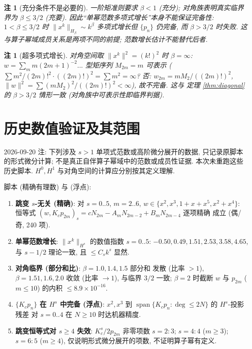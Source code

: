 \documentclass[UTF8]{ctexart}
\newtheorem{remark}[theorem]{注}
\begin{document}
\begin{remark}[充分条件不是必要的]
	一阶矩准则要求 $\beta < 1$ (充分); 对角族表明真实临界界为
	$\beta \leq 3/2$ (充要). 因此``单幂范数多项式增长''本身不能保证完备性:
	$1 < \beta \leq 3/2$ 时 $\|x^k\|_{H_\beta} \sim k^\beta$ 多项式增长但
	$\{p_n\}$ 仍完备, 而 $\beta > 3/2$ 时失败.
	这与算子幂域成员关系是两项不同的前提; 范数增长估计不能替代后者.
\end{remark}

\begin{remark}[超多项式增长]
	对角空间取 $\|x^k\|^2 = (k!)^2$ 时 $\beta = \infty$: $w = \sum_m
	m(2m+1)^{-2}...$ 型矩序列 $M_{2m} = m$ 可表示 ($\sum m^2/(2m)!^2
	\cdot ((2m)!)^2 = \sum m^2 = \infty$? 否: $w_{2m} = mM_2/((2m)!)^2$,
	$\|w\|^2 = \sum (mM_2)^2/((2m)!)^2 < \infty$), 故不完备. 这与
	定理 \ref{thm:diagonal} 的 $\beta > 3/2$ 情形一致 (对角族中可表示性即临界判据).
\end{remark}

\section{历史数值验证及其范围}
2026-09-20 注: 下列涉及 $s>1$ 单项式范数或高阶微分展开的数据,
只记录原脚本的形式微分计算; 不是真正自伴算子幂域中的范数或成员性证据.
本次未重跑这些历史脚本. $H^0,H^1$ 与对角空间的计算应分别按其定义理解.


脚本  (精确有理数) 与
 (浮点):
\begin{enumerate}
	\item \textbf{跳变 $s$-无关 (精确)}: 对 $s = 0..5$, $m = 2..6$,
		$w \in \{x^2, x^3, 1+x+x^5, x^2+x^4\}$: 恒等式
		$(w, K_c p_{2m})_s = cN_{2m} - A_mN_{2m-2} + B_mN_{2m-4}$ 逐项精确
		成立 (偶/奇, 240 项).
	\item \textbf{单幂范数增长}: $\|x^k\|_{H^s}$ 的数值指数 $s = 0..5$:
		$-0.50, 0.49, 1.51, 2.53, 3.58, 4.65$, 与 $s - 1/2$ 理论一致,
		且 $\leq C_s k^s$ 显然.
	\item \textbf{对角临界 (部分和比)}: $\beta = 1.0, 1.4, 1.5$ 部分和
		发散 (比率 $> 1$), $\beta = 1.51, 1.6, 2.0$ 收敛 (比率 $\to 1$),
		与临界 $3/2$ 一致; $\beta = 2$ 时截断 $w$ 与 $p_{2m}$
		($m \leq 10$) 的内积 $\leq 8.9\times10^{-16}$.
	\item \textbf{$\{K_c p_n\}$ 在 $H^s$ 中完备 (浮点)}: $x^2, x^3$ 到
		$\operatorname{span}\{K_c p_n : \deg \leq 2N\}$ 的 $H^s$-投影残差
		对 $s = 0..4$ 在 $N \geq 10$ 时达机器精度.
	\item \textbf{跳变恒等式对 $s \geq 4$ 失效}: $K_c^s/2 p_{2m}$ 非零项数
		$s=2: 3$; $s=4: 4$ ($m \geq 3$); $s=6: 5$ ($m \geq 4$),
		仅说明形式微分展开的项数, 不证明算子幂有定义.
\end{enumerate}
\end{document}
